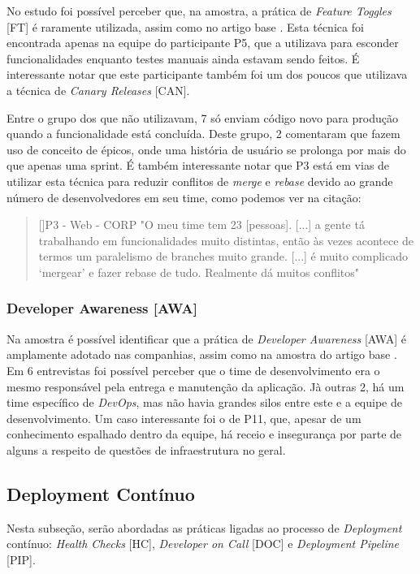 No estudo foi possível perceber que, na amostra, a prática de \emph{Feature Toggles} [FT] é raramente utilizada, assim como no artigo base \cite{empiricalStudy2016}. Esta técnica foi encontrada apenas na equipe do participante P5, que a utilizava para esconder funcionalidades enquanto testes manuais ainda estavam sendo feitos. É interessante notar que este participante também foi um dos poucos que utilizava a técnica de \emph{Canary Releases} [CAN].

Entre o grupo dos que não utilizavam, 7 só enviam código novo para produção quando a funcionalidade está concluída. Deste grupo, 2 comentaram que fazem uso de conceito de épicos, onde uma história de usuário se prolonga por mais do que apenas uma sprint. É também interessante notar que P3 está em vias de utilizar esta técnica para reduzir conflitos de \emph{merge} e \emph{rebase} devido ao grande número de desenvolvedores em seu time, como podemos ver na citação:

\begin{quotation}[]{P3 - Web - CORP}
    "O meu time tem 23 [pessoas]. [...] a gente tá trabalhando em funcionalidades muito distintas, então às vezes acontece de termos um paralelismo de branches muito grande. [...] é muito complicado ‘mergear’ e fazer rebase de tudo. Realmente dá muitos conflitos"
\end{quotation}


\subsubsection{Developer Awareness [AWA]}

Na amostra é possível identificar que a prática de \emph{Developer Awareness} [AWA] é amplamente adotado nas companhias, assim como na amostra do artigo base \cite{empiricalStudy2016}. Em 6 entrevistas foi possível perceber que o time de desenvolvimento era o mesmo responsável pela entrega e manutenção da aplicação. Jà outras 2, há um time específico de \emph{DevOps}, mas não havia grandes silos entre este e a equipe de desenvolvimento. Um caso interessante foi o de P11, que, apesar de um conhecimento espalhado dentro da equipe, há receio e insegurança por parte de alguns a respeito de questões de infraestrutura no geral.


\subsection{Deployment Contínuo}

Nesta subseção, serão abordadas as práticas ligadas ao processo de \emph{Deployment} contínuo: \emph{Health Checks} [HC], \emph{Developer on Call} [DOC] e \emph{Deployment Pipeline} [PIP].

